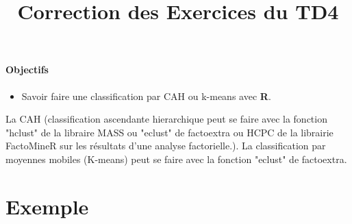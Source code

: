 \documentclass[a4paper]{article}
\title{Correction des Exercices du TD4}
\date{}
\newcommand{\R}{\textbf{R}}
\begin{document}


\maketitle{}
\paragraph{Objectifs}
\begin{itemize}
 
\item Savoir faire une classification par CAH ou k-means  avec \R.
\end{itemize}
La CAH (classification ascendante hierarchique peut se faire avec la fonction "hclust" de la libraire MASS ou "eclust" de factoextra ou HCPC de la librairie FactoMineR sur les résultats d'une analyse factorielle.). La classification par moyennes mobiles (K-means) peut se faire avec la fonction "eclust" de factoextra.
\section{Exemple} 
\end{document}
